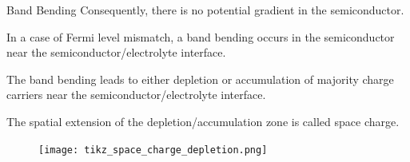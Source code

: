 \documentclass[10pt,compress]{beamer}
\begin{document}
\begin{frame}[allowframebreaks=1.0]{Band Bending}
        Consequently, there is no potential gradient in the semiconductor. 
        
        In a case of Fermi level mismatch, a band bending occurs in the semiconductor 
        near the semiconductor/electrolyte interface.  
        
        \framebreak
        The band bending leads to either depletion or accumulation of majority 
        charge carriers near the semiconductor/electrolyte interface. 
        
        The spatial extension of the depletion/accumulation zone is called space 
        charge.
    
        \begin{figure}[H]
            \centering
            \texttt{[image: tikz\_space\_charge\_depletion.png]}
            \label{fig_space_charge_depletion}
        \end{figure}

    \end{frame}
\end{document}
